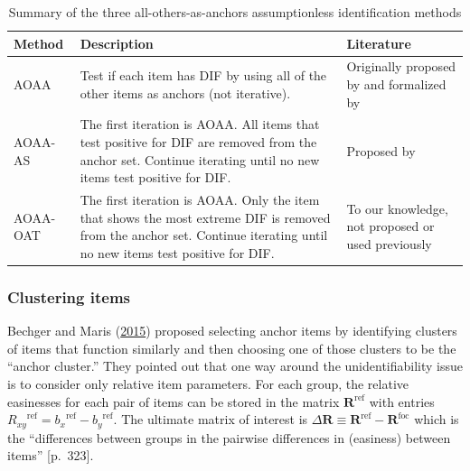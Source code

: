 \documentclass[
  11pt,
]{article}
\begin{document}
\begin{table}[H]
\caption{Summary of the three all-others-as-anchors assumptionless identification methods}
\centering
\begin{tabular}{|p{2.5cm}|p{6cm}|p{4cm}|}
\toprule

Method & Description & Literature \\

\midrule

AOAA & Test if each item has DIF by using all of the other items as anchors (not iterative). & Originally proposed by \cite{lord1980} and formalized by \cite{thissen1993detection} \\\hline

AOAA-AS & The first iteration is AOAA. All items that test positive for DIF are removed from the anchor set. Continue iterating until no new items test positive for DIF. & Proposed by \cite{drasgow1987study} \\\hline

AOAA-OAT & The first iteration is AOAA. Only the item that shows the most extreme DIF is removed from the anchor set. Continue iterating until no new items test positive for DIF. & To our knowledge, not proposed or used previously \\

\bottomrule
\end{tabular}
\label{table:themethods}
\end{table}

\hypertarget{clustering-items}{%
\subsubsection{Clustering items}\label{clustering-items}}

Bechger and Maris (\protect\hyperlink{ref-bechger2015statistical}{2015}) proposed selecting anchor items by identifying clusters of items that function similarly and then choosing one of those clusters to be the \enquote{anchor cluster.} They pointed out that one way around the unidentifiability issue is to consider only relative item parameters. For each group, the relative easinesses for each pair of items can be stored in the matrix \(\mathbf{R}^{\text{ref}}\) with entries \({R_{xy}}^{\text{ref}} = {b_x}^{\text{ref}} - {b_y}^{\text{ref}}\). The ultimate matrix of interest is \(\Delta \mathbf{R} \equiv \mathbf{R}^{\text{ref}}-\mathbf{R}^{\text{foc}}\) which is the \enquote{differences between groups in the pairwise differences in (easiness) between items} {[}p.~323{]}.
\end{document}
